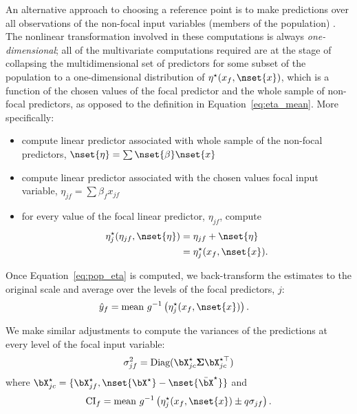 An alternative approach to choosing a reference point is to make predictions over all observations of the non-focal input variables (members of the population) \citep{hanmer2013behind}. The nonlinear transformation involved in these computations is always \emph{one-dimensional}; all of the multivariate computations required are at the stage of collapsing the multidimensional set of predictors for some subset of the population to a one-dimensional distribution of $\eta^\star(x_f, \nset{x})$, which is a function of the chosen values of the focal predictor and the whole sample of non-focal predictors, as opposed to the definition in Equation~\ref{eq:eta_mean}. More specifically:
\begin{itemize}
\item compute linear predictor associated with whole sample of the non-focal predictors, $\nset{\eta} = \sum \nset{\beta} \nset{x}$
\item compute linear predictor associated with the chosen values focal input variable, $\eta_{jf} = \sum{\beta_f x_{jf}}$
\item for every value of the focal linear predictor, $\eta_{jf}$, compute
%
\begin{align}\label{eq:pop_eta} 
\eta_j^\star(\eta_{jf}, \nset{\eta})  &= \eta_{jf} + \nset{\eta} \nonumber \\
&= \eta_j^\star(x_f, \nset{x}).
\end{align}
\end{itemize}
%

Once Equation~\ref{eq:pop_eta} is computed, we back-transform the estimates to the original scale and average over the levels of the focal predictors, $j$:
%
\begin{align}\label{eq:pop_response} 
\hat{y}_f  &= \textrm{mean} ~ g^{-1} \left(\eta_j^\star(x_f, \nset{x})\right).
\end{align}
%

We make similar adjustments to compute the variances of the predictions at every level of the focal input variable:
%
\begin{align}
\sigma_{jf}^2 = \textrm{Diag}(\bX^\star_{jc} \boldsymbol{\Sigma} \bX^{\star\top}_{jc})
\end{align}
where $\bX^{\star}_{jc} = \{\bX_{jf}^\star, \nset{{\bX}^\star} - \nset{{\bar{\bX}}^\star}\}$ and 
%
\begin{align}
\mathrm{CI}_f = \mathrm{mean} ~ g^{-1} \left(\eta_j^\star(x_f, \nset{x}) \pm q\sigma_{jf}\right).
\end{align}
%

